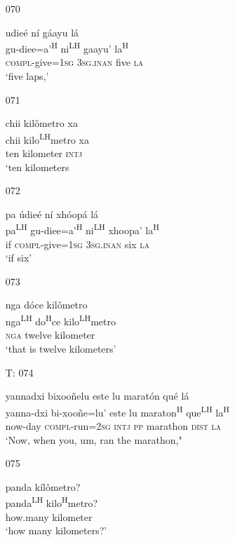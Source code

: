 \begin{itemize}
\item[070]
 
\glll   udie\'{e} n\'{i} g\'{a}ayu l\'{a}\\ 
 gu-diee=a'\textsuperscript{H} ni\textsuperscript{LH} gaayu' la\textsuperscript{H}\\
 \textsc{compl}-give=\textsc{1sg} \textsc{3sg.inan} five \textsc{la}\\
\glt `five laps,'
 

\item[071]
 
\glll   chii kil\v{o}metro xa\\
chii kilo\textsuperscript{LH}metro xa\\
 ten kilometer \textsc{intj}\\
\glt `ten kilometers
 

\item[072]
 
\glll   pa \'{u}die\'{e} n\'{i} xh\'{o}op\'{a} l\'{a}\\
pa\textsuperscript{LH} gu-diee=a'\textsuperscript{H} ni\textsuperscript{LH} xhoopa' la\textsuperscript{H}\\
 if \textsc{compl}-give=\textsc{1sg} \textsc{3sg.inan} six \textsc{la}\\
\glt `if six'
 

\item[073]
 
\glll  nga d\'{o}ce kil\v{o}metro\\
nga\textsuperscript{LH} do\textsuperscript{H}ce kilo\textsuperscript{LH}metro\\
 \textsc{nga} twelve kilometer\\
\glt `that is twelve kilometers'
 

\item[T: 074]
 
\glll   yannadxi bixoo\~{n}elu este lu marat\'{o}n qu\'{e} l\'{a}\\
 yanna-dxi bi-xoo\~{n}e=lu' este lu maraton\textsuperscript{H} que\textsuperscript{LH} la\textsuperscript{H}\\
 now-day \textsc{compl}-run=\textsc{2sg} \textsc{intj} \textsc{pp} marathon \textsc{dist} \textsc{la}\\
\glt `Now, when you, um, ran the marathon,"
 

\item[075]
 
panda k\'{i}l\v{o}metro?\\
panda\textsuperscript{LH} kilo\textsuperscript{H}metro?\\
 how.many kilometer\\
\glt `how many kilometers?'
 



\end{itemize}
